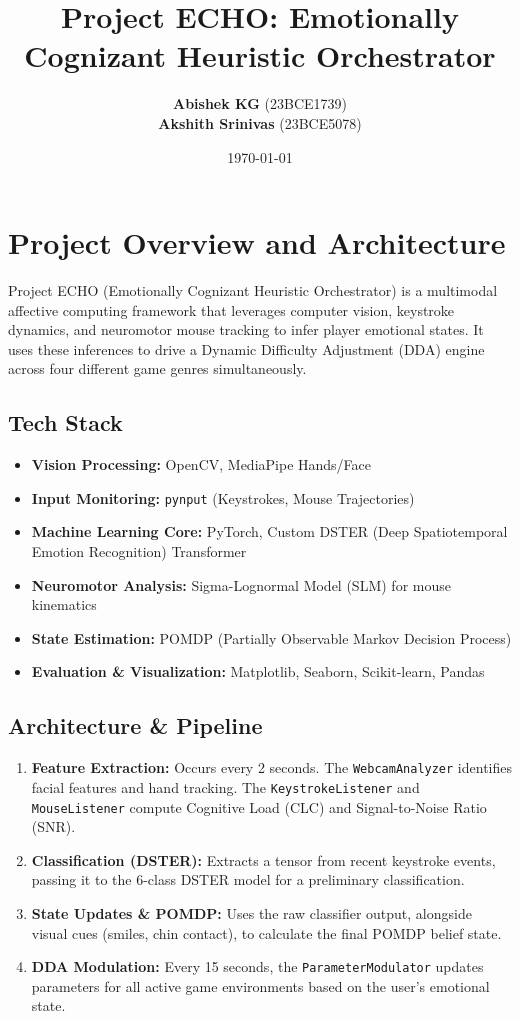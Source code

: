 \documentclass[11pt,a4paper]{article}
\title{\textbf{Project ECHO: Emotionally Cognizant Heuristic Orchestrator}}
\author{\textbf{Abishek KG} (23BCE1739) \\ \textbf{Akshith Srinivas} (23BCE5078)}
\date{\today}
\begin{document}
\maketitle
\newpage
\tableofcontents
\newpage

\section{Project Overview and Architecture}
Project ECHO (Emotionally Cognizant Heuristic Orchestrator) is a multimodal affective computing framework that leverages computer vision, keystroke dynamics, and neuromotor mouse tracking to infer player emotional states. It uses these inferences to drive a Dynamic Difficulty Adjustment (DDA) engine across four different game genres simultaneously.

\subsection{Tech Stack}
\begin{itemize}
    \item \textbf{Vision Processing:} OpenCV, MediaPipe Hands/Face
    \item \textbf{Input Monitoring:} \texttt{pynput} (Keystrokes, Mouse Trajectories)
    \item \textbf{Machine Learning Core:} PyTorch, Custom DSTER (Deep Spatiotemporal Emotion Recognition) Transformer
    \item \textbf{Neuromotor Analysis:} Sigma-Lognormal Model (SLM) for mouse kinematics
    \item \textbf{State Estimation:} POMDP (Partially Observable Markov Decision Process)
    \item \textbf{Evaluation \& Visualization:} Matplotlib, Seaborn, Scikit-learn, Pandas
\end{itemize}

\subsection{Architecture \& Pipeline}
\begin{enumerate}
    \item \textbf{Feature Extraction:} Occurs every 2 seconds. The \texttt{WebcamAnalyzer} identifies facial features and hand tracking. The \texttt{KeystrokeListener} and \texttt{MouseListener} compute Cognitive Load (CLC) and Signal-to-Noise Ratio (SNR).
    \item \textbf{Classification (DSTER):} Extracts a tensor from recent keystroke events, passing it to the 6-class DSTER model for a preliminary classification.
    \item \textbf{State Updates \& POMDP:} Uses the raw classifier output, alongside visual cues (smiles, chin contact), to calculate the final POMDP belief state.
    \item \textbf{DDA Modulation:} Every 15 seconds, the \texttt{ParameterModulator} updates parameters for all active game environments based on the user's emotional state.
\end{enumerate}
\end{document}
